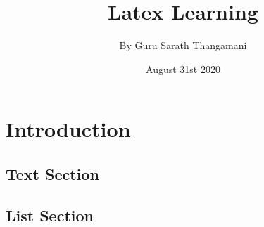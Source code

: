 \documentclass[a4paper,12pt]{book}
\begin{document}

\title{\Large{\textbf{Latex Learning}}}
\author{By Guru Sarath Thangamani}
\date{August 31st 2020}
\maketitle %
\let\cleardoublepage\clearpage %
\tableofcontents %

\setcounter{page}{2} %

%
%
\fancyhf{} %
\renewcommand{\headrulewidth}{2pt}
\renewcommand{\footrulewidth}{1pt}
\fancyhead[LE]{\leftmark} %
\fancyhead[LE]{\nouppercase}{\leftmark} %
\fancyfoot[LE,RO]{\thepage} %

\chapter{Introduction}

\section{Text Section}
\blindtext[5] %

\section{List Section}
%
%
\end{document}
